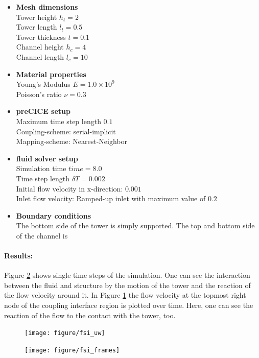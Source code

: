   \begin{itemize}
  	\item \textbf{Mesh dimensions}\\
  	Tower height $h_t = 2$\\
  	Tower length $l_t = 0.5$\\
  	Tower thickness $t = 0.1$\\
  	Channel height $h_c = 4$\\
  	Channel length $l_c = 10$  	
  	
  	\item \textbf{Material properties}\\
  	Young's Modulus $E = 1.0 \times 10^9$\\
  	Poisson's ratio $\nu = 0.3$
  	
  	\item \textbf{preCICE setup}\\
    Maximum time step length $0.1$\\
    Coupling-scheme: serial-implicit\\
    Mapping-scheme: Nearest-Neighbor
  	
  	\item \textbf{fluid solver setup}\\
    Simulation time $time = 8.0$\\
    Time step length $\delta T = 0.002$\\
  	Initial flow velocity in x-direction: $0.001$\\
  	Inlet flow velocity: Ramped-up inlet with maximum value of $0.2$\\
  	
  	\item \textbf{Boundary conditions}\\
  	The bottom side of the tower is simply supported.
  	The top and bottom side of the channel is %
  \end{itemize}
  
  \paragraph{Results:} 
   Figure \ref{fig:testI1} shows single time steps of the simulation. One can see the interaction between the fluid and structure by the motion of the tower and the reaction of the flow velocity around it. In Figure \ref{fig:testI2} the flow velocity at the topmost right node of the coupling interface region is plotted over time. Here, one can see the reaction of the flow to the contact with the tower, too. %
  \begin{figure}[htbp]
   \label{fig:testI2}
   \centering
   \texttt{[image: figure/fsi\_uw]}
   \caption{}
  \end{figure}
  
  \begin{landscape}
   \begin{figure}
    \label{fig:testI1}
    \centering
    \texttt{[image: figure/fsi\_frames]}
    \caption{}
   \end{figure}
  \end{landscape}